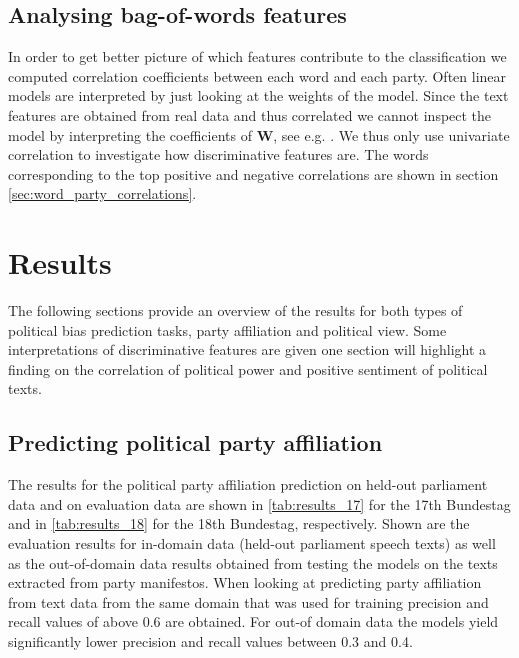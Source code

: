\documentclass[runningheads,a4paper]{llncs}
\renewcommand{\vec}[1]{\mathbf{#1}}
\begin{document}
\subsection{Analysing bag-of-words features}
In order to get  better picture of which features contribute to the classification we computed correlation coefficients between each word and each party. Often linear models are interpreted by just looking at the weights of the model. Since the text features are obtained from real data and thus correlated we cannot inspect the model by interpreting the coefficients of $\vec{W}$, see e.g. \cite{Haufe2013}.  We thus only use univariate correlation to investigate how discriminative features are. The words corresponding to the top positive and negative correlations are shown in section \autoref{sec:word_party_correlations}.

\section{Results}\label{sec:results}

The following sections provide an overview of the results for both types of political bias prediction tasks, party affiliation and political view. Some interpretations of discriminative features are given one section will highlight a finding on the correlation of political power and positive sentiment of political texts. 

\subsection{Predicting political party affiliation}
The results for the political party affiliation prediction on held-out parliament data and on evaluation data are shown in \autoref{tab:results_17} for the 17th Bundestag and in \autoref{tab:results_18} for the 18th Bundestag, respectively. 
Shown are the evaluation results for in-domain data (held-out parliament speech texts) as well as the out-of-domain data results obtained from testing the models on the texts extracted from party manifestos. When looking at predicting party affiliation from text data from the same domain that was used for training precision and recall values of above 0.6 are obtained. For out-of domain data the models yield significantly lower precision and recall values between 0.3 and 0.4.  \\
\end{document}
